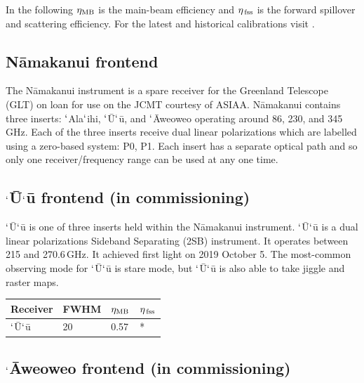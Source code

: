\documentclass[11pt,oneside,chapters]{starlink}
\newcommand{\uarcs}{\hspace{-0.27em}\arcsec\hspace{-0.07em}}
\newcommand{\uarcs}{$''$}
\begin{document}
In the following $\eta_{\textnormal{MB}}$ is the main-beam efficiency and
$\eta_{\textnormal{\,fss}}$ is the forward spillover and scattering efficiency.
For the latest and historical calibrations visit
.



\subsection{N\=amakanui frontend}
\label{sec:namakanui}

The N\=amakanui instrument is a spare receiver for the Greenland
Telescope (GLT) on loan for use on the JCMT courtesy of ASIAA.
N\=amakanui contains three inserts: $`$Ala$`$ihi, $`$\=U$`$\=u, and
$`$\=Aweoweo operating around 86, 230, and 345\,GHz. Each of the three
inserts receive dual linear polarizations which are labelled using a
zero-based system: P0, P1. Each insert has a separate optical path and
so only one receiver/frequency range can be used at any one time.

\subsection{$`$\=U$`$\=u frontend (in commissioning)}
\label{sec:uu}

$`$\=U$`$\=u is one of three inserts held within the N\=amakanui
instrument. $`$\=U$`$\=u is a dual linear polarizations Sideband
Separating (2SB) instrument. It operates between 215 and 270.6\,GHz.
It achieved first light on 2019 October 5.  The most-common observing
mode for $`$\=U$`$\=u is stare mode, but $`$\=U$`$\=u is also able to
take jiggle and raster maps.

\begin{table}[h!]
\begin{center}
\begin{tabular}{|p{1.5cm}|p{1.2cm}|p{0.8cm}|p{0.8cm}|}
\hline
Receiver &FWHM & $\eta_{\textnormal{MB}}$ & $\eta_{\textnormal{\,fss}}$\\
\hline
$`$\=U$`$\=u&20\uarcs&0.57 & *\\
\hline
\end{tabular}
\end{center}
\end{table}


\subsection{$`$\=Aweoweo frontend (in commissioning)}
\end{document}
